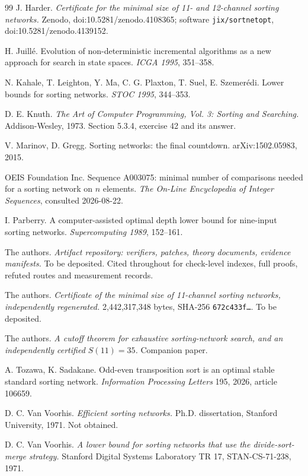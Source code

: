 \documentclass[11pt,a4paper]{article}
\begin{document}
\begin{thebibliography}{99}
 J. Harder. \emph{Certificate for the minimal size of 11- and
12-channel sorting networks.} Zenodo, doi:10.5281/zenodo.4108365; software
\texttt{jix/sortnetopt}, doi:10.5281/zenodo.4139152.

 H. Juill\'e. Evolution of non-deterministic incremental
algorithms as a new approach for search in state spaces. \emph{ICGA 1995},
351--358.

 N. Kahale, T. Leighton, Y. Ma, C. G. Plaxton, T. Suel,
E. Szemer\'edi. Lower bounds for sorting networks. \emph{STOC 1995}, 344--353.

 D. E. Knuth. \emph{The Art of Computer Programming, Vol. 3:
Sorting and Searching.} Addison-Wesley, 1973. Section 5.3.4, exercise 42 and its
answer.

 V. Marinov, D. Gregg. Sorting networks: the final countdown.
arXiv:1502.05983, 2015.

 OEIS Foundation Inc. Sequence A003075: minimal number of
comparisons needed for a sorting network on $n$ elements.
\emph{The On-Line Encyclopedia of Integer Sequences}, consulted 2026-08-22.

 I. Parberry. A computer-assisted optimal depth lower bound for
nine-input sorting networks. \emph{Supercomputing 1989}, 152--161.

 The authors. \emph{Artifact repository: verifiers, patches, theory
documents, evidence manifests.} To be deposited. Cited throughout for
check-level indexes, full proofs, refuted routes and measurement records.

 The authors. \emph{Certificate of the minimal size of 11-channel
sorting networks, independently regenerated.} 2{,}442{,}317{,}348 bytes,
SHA-256 \texttt{672c433f\dots}. To be deposited.

 The authors. \emph{A cutoff theorem for exhaustive
sorting-network search, and an independently certified $S(11) = 35$.}
Companion paper.

 A. Tozawa, K. Sadakane. Odd-even transposition sort is an optimal
stable standard sorting network. \emph{Information Processing Letters} 195,
2026, article 106659.

 D. C. Van Voorhis. \emph{Efficient sorting networks.}
Ph.D. dissertation, Stanford University, 1971. Not obtained.

 D. C. Van Voorhis. \emph{A lower bound for sorting networks that
use the divide-sort-merge strategy.} Stanford Digital Systems Laboratory
TR 17, STAN-CS-71-238, 1971.


\end{thebibliography}
\end{document}
